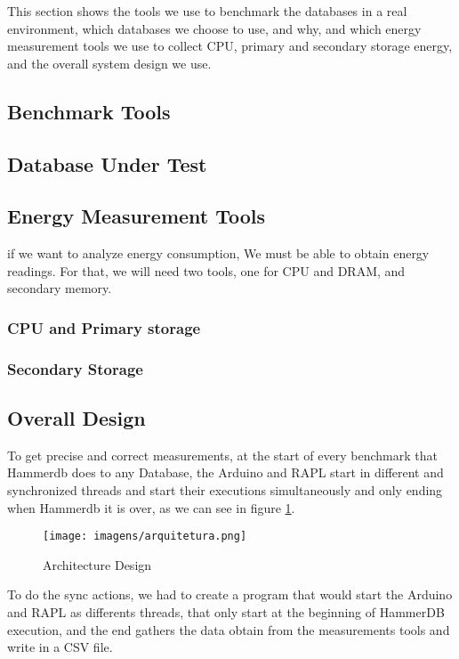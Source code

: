 This section shows the tools we use to benchmark the databases in a real environment, which databases we choose to use, and why, and which energy measurement tools we use to collect CPU, primary and secondary storage energy, and the overall system design we use.

\subsection{Benchmark Tools}



\subsection{Database Under Test}



\subsection{Energy Measurement Tools}
if we want to analyze energy consumption, We must be able to obtain energy readings. For that, we will need two tools, one for CPU and DRAM, and secondary memory.

\subsubsection{\textbf{CPU and Primary storage}}


    
\subsubsection{\textbf{Secondary Storage}}




\subsection{Overall Design}

To get precise and correct measurements, at the start of every benchmark that Hammerdb does to any Database, the Arduino and RAPL start in different and synchronized threads and start their executions simultaneously and only ending when Hammerdb it is over, as we can see in figure \ref{fig:arch}.

\begin{figure}[H]
  \centering
    \caption{Architecture Design}
  \texttt{[image: imagens/arquitetura.png]}
  \label{fig:arch}
\end{figure}


To do the sync actions, we had to create a program that would start the Arduino and RAPL as differents threads, that only start at the beginning of HammerDB execution, and the end gathers the data obtain from the measurements tools and write in a CSV file.








